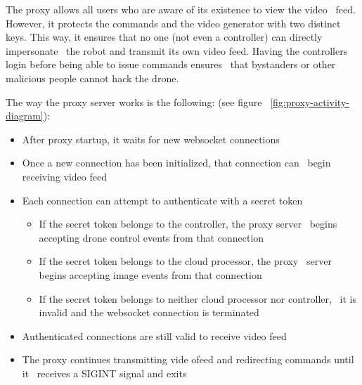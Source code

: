 The proxy allows all users who are aware of its existence to view the video \
feed.
However, it protects the commands and the video generator with two distinct keys.
This way, it ensures that no one (not even a controller) can directly impersonate \
the robot and transmit its own video feed.
Having the controllers login before being able to issue commands ensures \
that bystanders or other malicious people cannot hack the drone.

The way the proxy server works is the following: (see figure ~\ref{fig:proxy-activity-diagram}):
\begin{itemize}
    \item After proxy startup, it waits for new websocket connections
    \item Once a new connection has been initialized, that connection can \
            begin receiving video feed
    \item Each connection can attempt to authenticate with a secret token
        \begin{itemize}
            \item If the secret token belongs to the controller, the proxy server \
                    begins accepting drone control events from that connection
            \item If the secret token belongs to the cloud processor, the proxy \
                    server begins accepting image events from that connection
            \item If the secret token belongs to neither cloud processor nor controller, \
                    it is invalid and the websocket connection is terminated
        \end{itemize}
    \item Authenticated connections are still valid to receive video feed
    \item The proxy continues transmitting vide ofeed and redirecting commands until it \
            receives a SIGINT signal and exits
\end{itemize}

